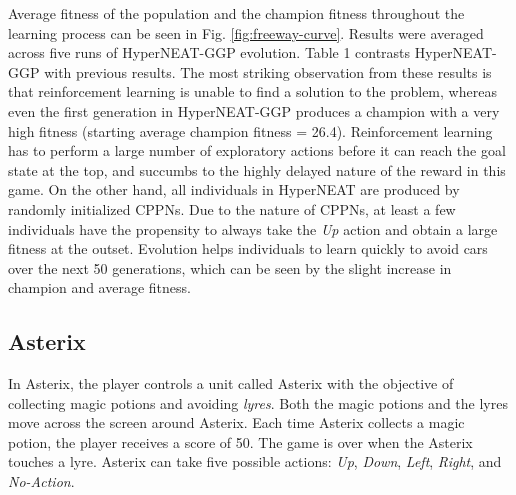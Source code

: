 \documentclass{sig-alternate}
\begin{document}
Average fitness of the population and the champion fitness throughout the learning process can be seen in Fig. \ref{fig:freeway-curve}. Results were averaged across five runs of HyperNEAT-GGP evolution. Table 1 contrasts HyperNEAT-GGP with previous results. The most striking observation from these results is that reinforcement learning is unable to find a solution to the problem, whereas even the first generation in HyperNEAT-GGP produces a champion with a very high fitness (starting average champion fitness = 26.4). Reinforcement learning has to perform a large number of exploratory actions before it can reach the goal state at the top, and succumbs to the highly delayed nature of the reward in this game. On the other hand, all individuals in HyperNEAT are produced by randomly initialized CPPNs. Due to the nature of CPPNs, at least a few individuals have the propensity to always take the \textit{Up} action and obtain a large fitness at the outset. Evolution helps individuals to learn quickly to avoid cars over the next 50 generations, which can be seen by the slight increase in champion and average fitness.

\subsection {Asterix}
In Asterix, the player controls a unit called Asterix with the objective of collecting magic potions and avoiding \textit{lyres}. Both the magic potions and the lyres move across the screen around Asterix. Each time Asterix collects a magic potion, the player receives a score of 50. The game is over when the Asterix touches a lyre. Asterix can take five possible actions: \textit{Up}, \textit{Down}, \textit{Left}, \textit{Right}, and \textit{No-Action}.
\end{document}
